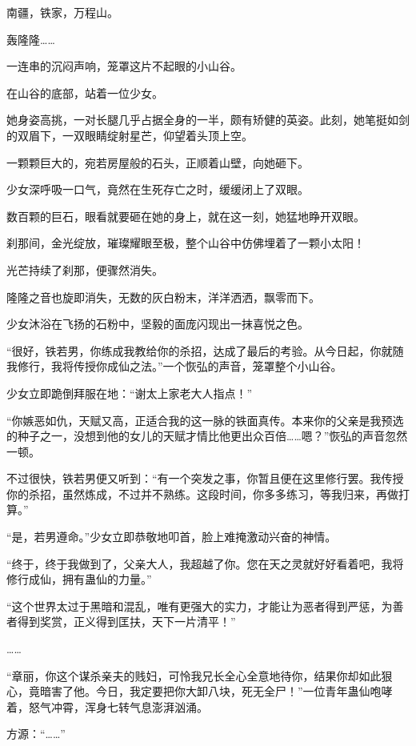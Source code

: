 
\begin{this_body}

南疆，铁家，万程山。

轰隆隆……

一连串的沉闷声响，笼罩这片不起眼的小山谷。

在山谷的底部，站着一位少女。

她身姿高挑，一对长腿几乎占据全身的一半，颇有矫健的英姿。此刻，她笔挺如剑的双眉下，一双眼睛绽射星芒，仰望着头顶上空。

一颗颗巨大的，宛若房屋般的石头，正顺着山壁，向她砸下。

少女深呼吸一口气，竟然在生死存亡之时，缓缓闭上了双眼。

数百颗的巨石，眼看就要砸在她的身上，就在这一刻，她猛地睁开双眼。

刹那间，金光绽放，璀璨耀眼至极，整个山谷中仿佛埋着了一颗小太阳！

光芒持续了刹那，便骤然消失。

隆隆之音也旋即消失，无数的灰白粉末，洋洋洒洒，飘零而下。

少女沐浴在飞扬的石粉中，坚毅的面庞闪现出一抹喜悦之色。

“很好，铁若男，你练成我教给你的杀招，达成了最后的考验。从今日起，你就随我修行，我将传授你成仙之法。”一个恢弘的声音，笼罩整个小山谷。

少女立即跪倒拜服在地：“谢太上家老大人指点！”

“你嫉恶如仇，天赋又高，正适合我的这一脉的铁面真传。本来你的父亲是我预选的种子之一，没想到他的女儿的天赋才情比他更出众百倍……嗯？”恢弘的声音忽然一顿。

不过很快，铁若男便又听到：“有一个突发之事，你暂且便在这里修行罢。我传授你的杀招，虽然炼成，不过并不熟练。这段时间，你多多练习，等我归来，再做打算。”

“是，若男遵命。”少女立即恭敬地叩首，脸上难掩激动兴奋的神情。

“终于，终于我做到了，父亲大人，我超越了你。您在天之灵就好好看着吧，我将修行成仙，拥有蛊仙的力量。”

“这个世界太过于黑暗和混乱，唯有更强大的实力，才能让为恶者得到严惩，为善者得到奖赏，正义得到匡扶，天下一片清平！”

……

“章丽，你这个谋杀亲夫的贱妇，可怜我兄长全心全意地待你，结果你却如此狠心，竟暗害了他。今日，我定要把你大卸八块，死无全尸！”一位青年蛊仙咆哮着，怒气冲霄，浑身七转气息澎湃汹涌。

方源：“……”


\end{this_body}
